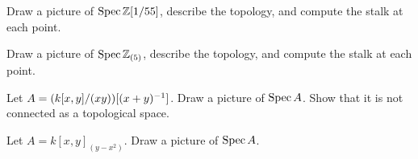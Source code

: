 
\section{\problemhead}
\begin{problem}
	Draw a picture of $\operatorname{Spec} \mathbb Z[1/55]$,
	describe the topology, and compute the stalk at each point.
\end{problem}

\begin{problem}
	Draw a picture of $\operatorname{Spec} \mathbb Z_{(5)}$,
	describe the topology, and compute the stalk at each point.
\end{problem}

\begin{problem}
	Let $A = (k[x,y]/(xy))[(x+y)^{-1}]$.
	Draw a picture of $\operatorname{Spec} A$.
	Show that it is not connected as a topological space.
\end{problem}

\begin{problem}
	Let $A = k[x,y]_{(y-x^2)}$.
	Draw a picture of $\operatorname{Spec} A$.
\end{problem}
